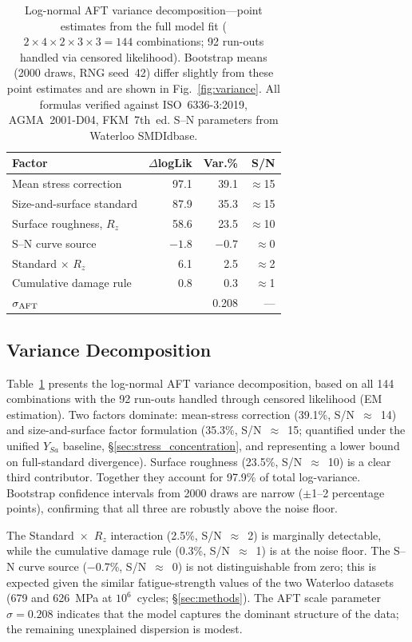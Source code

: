 \documentclass[12pt,a4paper]{article}
\begin{document}
\begin{table}[h]
\centering
\caption{Log-normal AFT variance decomposition---point estimates from the
full model fit ($2\times4\times2\times3\times3 = 144$ combinations;
92 run-outs handled via censored likelihood). Bootstrap means
(2000 draws, RNG seed~42) differ slightly from these point estimates
and are shown in Fig.~\ref{fig:variance}.%
All formulas verified against ISO~6336-3:2019, AGMA~2001-D04, FKM~7th~ed.
S--N parameters from Waterloo SMDIdbase.}
\label{tab:anova}
\begin{tabular}{lrrr}
\toprule
Factor & $\Delta$logLik & Var.\% & S/N \\
\midrule
Mean stress correction      &  97.1 & 39.1 & $\approx$15 \\
Size-and-surface standard   &  87.9 & 35.3 & $\approx$15 \\
Surface roughness, $R_z$    &  58.6 & 23.5 & $\approx$10 \\
S--N curve source           & $-1.8$ & $-0.7$ & $\approx$0 \\
Standard $\times$ $R_z$     &   6.1 &  2.5 &  $\approx$2 \\
Cumulative damage rule      &   0.8 &  0.3 &  $\approx$1 \\
\midrule
$\sigma_{\rm AFT}$          &        & 0.208 & --- \\
\bottomrule
\end{tabular}
\end{table}

\subsection{Variance Decomposition}

Table~\ref{tab:anova} presents the log-normal AFT variance
decomposition, based on all 144 combinations with the 92 run-outs
handled through censored likelihood (EM estimation). Two factors
dominate: mean-stress correction (39.1\%, S/N~$\approx$~14) and
size-and-surface factor formulation (35.3\%, S/N~$\approx$~15;
quantified under the unified $Y_{Sa}$ baseline, \S\ref{sec:stress_concentration},
and representing a lower bound on full-standard divergence). Surface
roughness (23.5\%, S/N~$\approx$~10) is a clear third contributor.
Together they account for 97.9\% of total
log-variance. Bootstrap confidence intervals from 2000 draws are narrow
($\pm$1--2 percentage points), confirming that all three are robustly
above the noise floor.

The Standard~$\times$~$R_z$ interaction (2.5\%, S/N~$\approx$~2) is
marginally detectable, while the cumulative damage rule (0.3\%,
S/N~$\approx$~1) is at the noise floor. The S--N curve source
($-$0.7\%, S/N~$\approx$~0) is not distinguishable from zero; this
is expected given the similar fatigue-strength values of the two
Waterloo datasets (679 and 626~MPa at $10^6$~cycles;
\S\ref{sec:methods}). The
AFT scale parameter $\sigma = 0.208$ indicates that the model
captures the dominant structure of the data; the remaining
unexplained dispersion is modest.
\end{document}
